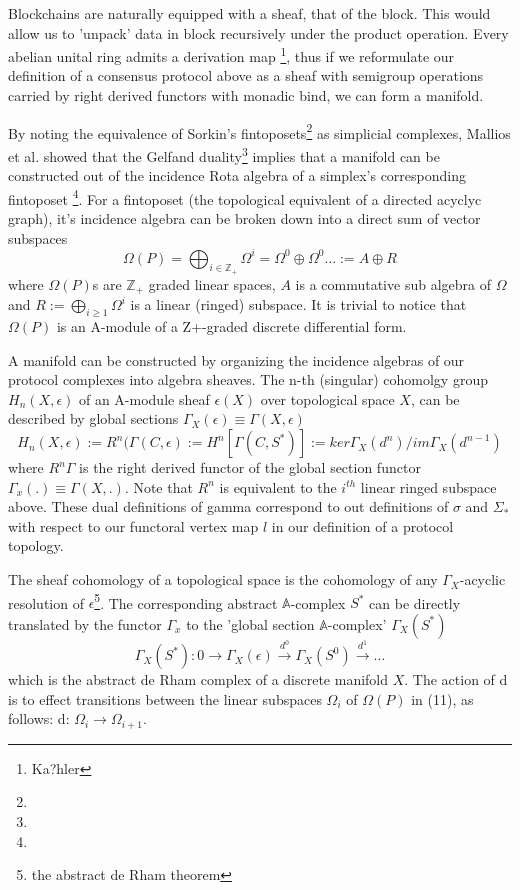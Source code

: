 \documentclass{article}
\begin{document}
Blockchains are naturally equipped with a sheaf, that of the block.  This would allow us to 'unpack' data in block recursively under the product operation. Every abelian unital ring admits a derivation map \footnote{Ka?hler}, thus if we reformulate our definition of a consensus protocol above as a sheaf with semigroup operations carried by right derived functors with monadic bind, we can form a manifold.

By noting the equivalence of Sorkin's fintoposets\footnote{} as simplicial complexes, Mallios et al. showed that the Gelfand duality\footnote{} implies that a manifold can be constructed out of the incidence Rota algebra of a simplex's corresponding fintoposet \footnote{}. For a fintoposet (the topological equivalent of a directed acyclyc graph), it's incidence algebra can be broken down into a direct sum of vector subspaces
\begin{equation} \label{eq1}
\Omega(P) = \bigoplus_{i \in \mathbb{Z}_+} \Omega^i = \Omega^0 \oplus \Omega^0 \dots := A \oplus R
\end{equation} \label{eq1}
where $\Omega(P)$s are $\mathbb{Z}_+$ graded linear spaces, $A$ is a commutative sub algebra of $\Omega$ and $R := \bigoplus_{i \geq 1} \Omega^i$ is a linear (ringed) subspace. It is trivial to notice that $\Omega(P)$ is an A-module of a Z+-graded discrete differential form. 

A manifold can be constructed by organizing the incidence algebras of our protocol complexes into algebra sheaves. The n-th (singular) cohomolgy group $H_n(X, \epsilon)$ of an A-module sheaf $\epsilon(X)$ over topological space $X$, can be described by global sections $\Gamma_X(\epsilon) \equiv \Gamma (X, \epsilon)$
\begin{equation} \label{eq1}
H_n(X, \epsilon) := R^n(\Gamma(C,\epsilon) := H^n[\Gamma(C, S^*)] := ker\Gamma_X(d^n)/im\Gamma_X(d^{n-1})
\end{equation} \label{eq1}
where $R^n\Gamma$ is the right derived functor of the global section functor $\Gamma_x(.) \equiv \Gamma(X,.)$. Note that $R^n$ is equivalent to the $i^{th}$ linear ringed subspace above. These dual definitions of gamma correspond to out definitions of $\sigma$ and $\Sigma_*$ with respect to our functoral vertex map $l$ in our definition of a protocol topology.

The sheaf cohomology of a topological space is the cohomology of any $\Gamma_X$-acyclic resolution of $\epsilon$\footnote{the abstract de Rham theorem}. The corresponding abstract $\mathbb{A}$-complex $S^*$ can be directly translated by the functor $\Gamma_x$ to the 'global section $\mathbb{A}$-complex' $\Gamma_X(S^*)$
\begin{equation} \label{eq1}
\Gamma_X(S^*):  0 \xrightarrow{~} \Gamma_X(\epsilon) \xrightarrow{d^0} \Gamma_X(S^0) \xrightarrow{d^1} \dots
\end{equation} \label{eq1}
which is the abstract de Rham complex of a discrete manifold $X$. The action of d is to effect transitions between the linear subspaces $\Omega_i$ of $\Omega(P)$ in (11), as follows: d: $\Omega_i \rightarrow \Omega_{i+1}$.
\end{document}
